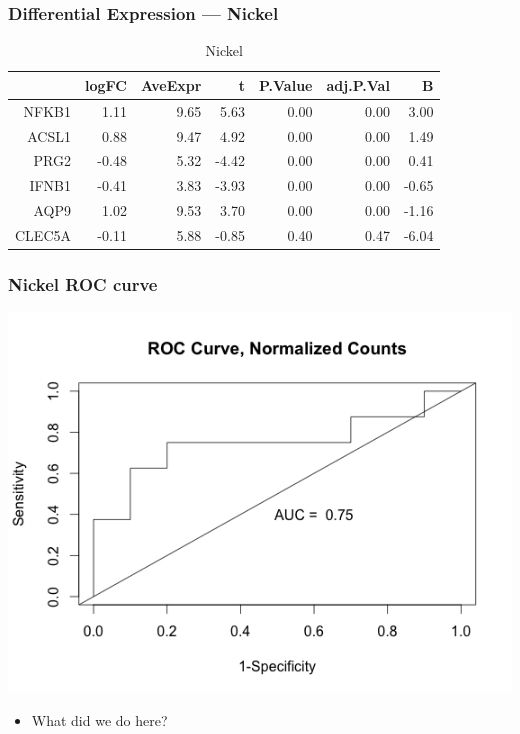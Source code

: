 \documentclass{beamer}
\begin{document}
\begin{frame}[fragile]
  	\frametitle{Differential Expression --- Nickel}
 		\begin{table}[ht]
		\caption {Nickel} \label{tab:nickel} 
		\centering
		\begin{tabular}{rrrrrrr}
 			\hline
 			& logFC & AveExpr & t & P.Value & adj.P.Val & B \\ 
  			\hline
			NFKB1 & 1.11 & 9.65 & 5.63 & 0.00 & 0.00 & 3.00 \\ 
  			ACSL1 & 0.88 & 9.47 & 4.92 & 0.00 & 0.00 & 1.49 \\ 
  			PRG2 & -0.48 & 5.32 & -4.42 & 0.00 & 0.00 & 0.41 \\ 
  			IFNB1 & -0.41 & 3.83 & -3.93 & 0.00 & 0.00 & -0.65 \\ 
  			AQP9 & 1.02 & 9.53 & 3.70 & 0.00 & 0.00 & -1.16 \\ 
  			CLEC5A & -0.11 & 5.88 & -0.85 & 0.40 & 0.47 & -6.04 \\ 
  			 \hline
		\end{tabular}
		\end{table}
\end{frame}

\begin{frame}
	 \frametitle{Nickel ROC curve}
		\centering
	 	\includegraphics[scale=0.45]{../paper/figs/Nickel_ASCL1-APQ9.png} 
                \begin{itemize}
			\item What did we do here?
		\end{itemize}

\end{frame}
\end{document}
